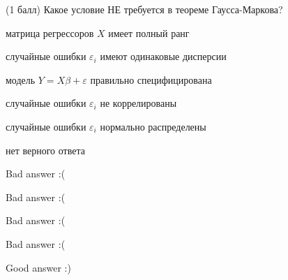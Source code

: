 
\begin{question}
(1 балл) Какое условие НЕ требуется в теореме Гаусса-Маркова?
\begin{answerlist}[2]
  \item матрица регрессоров \(X\) имеет полный ранг
  \item случайные ошибки \(\varepsilon_i\) имеют одинаковые дисперсии
  \item модель \(Y=X\beta + \varepsilon\) правильно специфицирована
  \item случайные ошибки \(\varepsilon_i\) не коррелированы
  \item случайные ошибки \(\varepsilon_i\) нормально распределены
  \item нет верного ответа
\end{answerlist}
\end{question}

\begin{solution}
\begin{answerlist}
  \item Bad answer :(
  \item Bad answer :(
  \item Bad answer :(
  \item Bad answer :(
  \item Good answer :)
\end{answerlist}
\end{solution}
